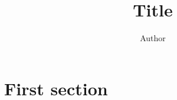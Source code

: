 \documentclass{article}
\author{Author}
\title{Title}
\begin{document}
\maketitle

\section{First section}
\end{document}
